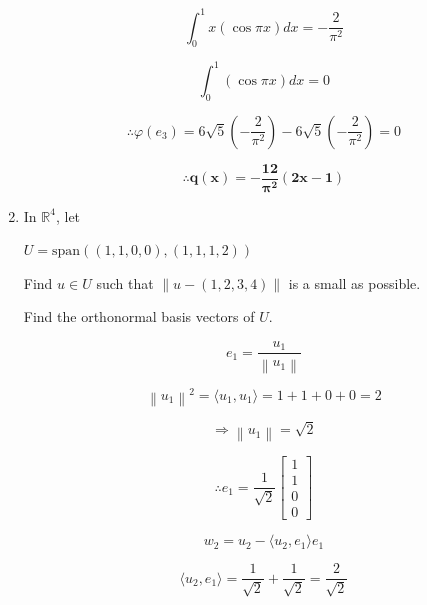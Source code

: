 \documentclass[fleqn]{article}
\newcommand{\norm}[1]{\left \lVert #1 \right \rVert}
\begin{document}
\begin{enumerate}[nolistsep]
		\begin{equation*}
			\int_{0}^{1}{x(\cos{{\pi}x})dx} = -\frac{2}{{\pi}^2}
		\end{equation*}
		
		\begin{equation*}
			\int_{0}^{1}{(\cos{{\pi}x})dx} = 0
		\end{equation*}
		
		\begin{equation*}
			\therefore \varphi(e_3) = 6\sqrt{5}\left(-\frac{2}{{\pi}^2}\right) - 6\sqrt{5}\left(-\frac{2}{{\pi}^2}\right) = 0
		\end{equation*}
		
		\begin{equation*}
			\mathbf{\therefore q(x) = -\frac{12}{{\pi}^2}(2x - 1)}
		\end{equation*}
		
		\item In $\mathbb{R}^4$, let
		
		$U = \text{span}((1,1,0,0),(1,1,1,2))$
		
		Find $u \in U$ such that $\norm{u - (1,2,3,4)}$ is a small as possible.
		
		Find the orthonormal basis vectors of $U$.
		
		\begin{equation*}
			e_1 = \frac{u_1}{\norm{u_1}}
		\end{equation*}
		
		\begin{equation*}
			\norm{u_1}^2 = \langle u_1, u_1 \rangle = 1 + 1 + 0 + 0 = 2
		\end{equation*}
		
		\begin{equation*}
			\Rightarrow \norm{u_1} = \sqrt{2} 
		\end{equation*}
		
		\begin{equation*}
			\therefore e_1 = \frac{1}{\sqrt{2}}\begin{bmatrix}1\\1\\0\\0\end{bmatrix}
		\end{equation*}
		
		\begin{equation*}
			w_2 = u_2 - \langle u_2, e_1 \rangle e_1
		\end{equation*}
		
		\begin{equation*}
			\langle u_2, e_1 \rangle = \frac{1}{\sqrt{2}} + \frac{1}{\sqrt{2}} = \frac{2}{\sqrt{2}}
		\end{equation*}
		

\end{enumerate}
\end{document}
